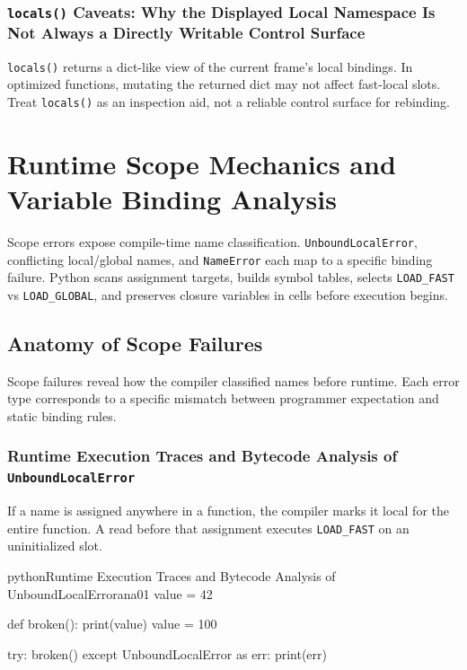 \documentclass[a4paper,twoside]{report}
\begin{document}
\subsubsection{\texttt{locals()} Caveats: Why the Displayed Local Namespace Is Not Always a Directly Writable Control Surface}

\texttt{locals()} returns a dict-like view of the current frame's local bindings. In optimized functions, mutating the returned dict may not affect fast-local slots. Treat \texttt{locals()} as an inspection aid, not a reliable control surface for rebinding.


\section{Runtime Scope Mechanics and Variable Binding Analysis}

Scope errors expose compile-time name classification. \texttt{UnboundLocalError}, conflicting local/global names, and \texttt{NameError} each map to a specific binding failure. Python scans assignment targets, builds symbol tables, selects \texttt{LOAD\_FAST} vs \texttt{LOAD\_GLOBAL}, and preserves closure variables in cells before execution begins.


\subsection{Anatomy of Scope Failures}

Scope failures reveal how the compiler classified names before runtime. Each error type corresponds to a specific mismatch between programmer expectation and static binding rules.

\subsubsection{Runtime Execution Traces and Bytecode Analysis of \texttt{UnboundLocalError}}

If a name is assigned anywhere in a function, the compiler marks it local for the entire function. A read before that assignment executes \texttt{LOAD\_FAST} on an uninitialized slot.

\begin{codebox}[]{python}{Runtime Execution Traces and Bytecode Analysis of UnboundLocalError}{ana01}
value = 42

def broken():
    print(value)
    value = 100

try:
    broken()
except UnboundLocalError as err:
    print(err)
\end{codebox}
\end{document}
